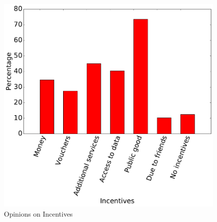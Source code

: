 \begin{figure}[ht!]
\centering
\includegraphics[width=\textwidth,keepaspectratio]{./images/pre_incentives}
\caption{Opinions on Incentives}
\label{fig:pre_q15}
\end{figure}

